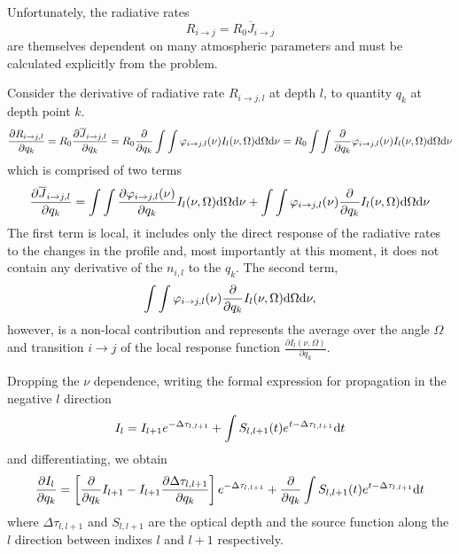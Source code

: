 \documentclass[a4paper]{article}
\begin{document}
Unfortunately, the radiative rates
$$
R_{i\rightarrow j}=R_0 \overline{J}_{i\rightarrow j}
$$
are themselves dependent on many atmospheric parameters and must be calculated explicitly from the problem.

Consider the derivative of radiative rate $R_{i\rightarrow j,l}$ at depth $l$, to quantity $q_k$ at depth point $k$.
$$
\frac{\partial R_{i\rightarrow j,l}}{\partial q_k}=R_0\frac{\partial\overline{J}_{i\rightarrow j,l}}{\partial q_k}=R_0\frac{\partial}{\partial q_k}\int \int \varphi_{i\rightarrow j,l}(\nu) I_l(\nu,\Omega) {\rm d}\Omega{\rm d}\nu=R_0\int \int \frac{\partial}{\partial q_k}\varphi_{i\rightarrow j,l}(\nu) I_l(\nu,\Omega) {\rm d}\Omega{\rm d}\nu
$$
which is comprised of two terms
$$
\frac{\partial\overline{J}_{i\rightarrow j,l}}{\partial q_k}=\int \int \frac{\partial\varphi_{i\rightarrow j,l}(\nu)}{\partial q_k} I_l(\nu,\Omega) {\rm d}\Omega{\rm d}\nu+\int \int \varphi_{i\rightarrow j,l}(\nu)\frac{\partial}{\partial q_k} I_l(\nu,\Omega) {\rm d}\Omega{\rm d}\nu
$$
The first term is local, it includes only the direct response of the radiative rates to the changes in the profile and, most importantly at this moment, it does not contain any derivative of the $n_{i,l}$ to the $q_k$. The second term, 
$$
\int \int \varphi_{i\rightarrow j,l}(\nu)\frac{\partial}{\partial q_k} I_l(\nu,\Omega) {\rm d}\Omega{\rm d}\nu,
$$
however, is a non-local contribution and represents the average over the angle $\Omega$ and transition $i\rightarrow j$ of the local response function $\frac{\partial I_l(\nu,\Omega)}{\partial q_k}$.

Dropping the $\nu$ dependence, writing the formal expression for propagation in the negative $l$ direction
$$
I_l=I_{l+1} e^{-\Delta\tau_{l,l+1}}+\int S_{l,l+1}(t) e^{t-\Delta\tau_{l,l+1}} {\rm d}t
$$
and differentiating, we obtain
$$
\frac{\partial I_l}{\partial q_k}=\left[\frac{\partial}{\partial q_k}I_{l+1} - I_{l+1} \frac{\partial \Delta\tau_{l,l+1}}{\partial q_k}\right]e^{-\Delta\tau_{l,l+1}} +\frac{\partial}{\partial q_k}\int S_{l,l+1}(t) e^{t-\Delta\tau_{l,l+1}} {\rm d}t
$$
where $\Delta\tau_{l,l+1}$ and $S_{l,l+1}$ are the optical depth and the source function along the $l$ direction between indixes $l$ and $l+1$ respectively.
\end{document}
